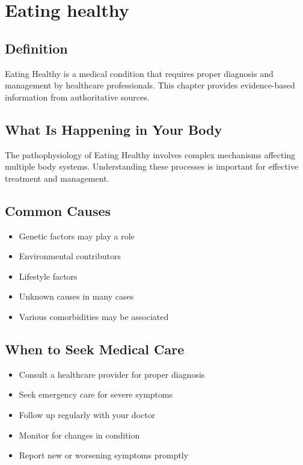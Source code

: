 
\chapter{Eating healthy}

\section*{Definition}
Eating Healthy is a medical condition that requires proper diagnosis and management by healthcare professionals. This chapter provides evidence-based information from authoritative sources.

\section*{What Is Happening in Your Body}
The pathophysiology of Eating Healthy involves complex mechanisms affecting multiple body systems. Understanding these processes is important for effective treatment and management.

\section*{Common Causes}
\begin{itemize}
  \item Genetic factors may play a role
  \item Environmental contributors
  \item Lifestyle factors
  \item Unknown causes in many cases
  \item Various comorbidities may be associated
\end{itemize}

\section*{When to Seek Medical Care}
\begin{itemize}
  \item Consult a healthcare provider for proper diagnosis
  \item Seek emergency care for severe symptoms
  \item Follow up regularly with your doctor
  \item Monitor for changes in condition
  \item Report new or worsening symptoms promptly
\end{itemize}

